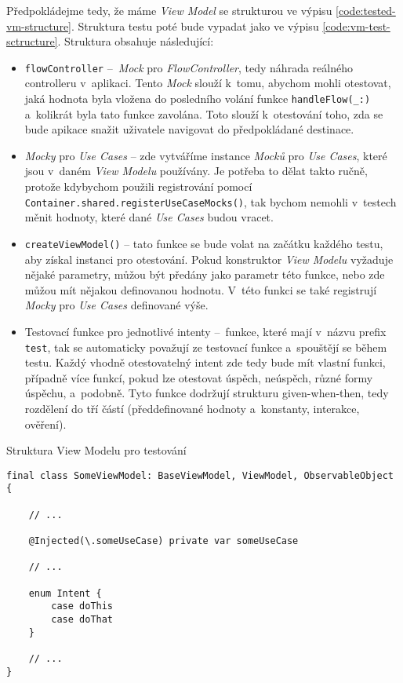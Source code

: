 Předpokládejme tedy, že máme \emph{View Model} se strukturou ve výpisu \ref{code:tested-vm-structure}. Struktura testu poté bude vypadat jako ve výpisu \ref{code:vm-test-sctructure}. Struktura obsahuje následující:
\begin{itemize}
\item\texttt{flowController} – \emph{Mock} pro \emph{FlowController}, tedy náhrada reálného controlleru v~aplikaci. Tento \emph{Mock} slouží k~tomu, abychom mohli otestovat, jaká hodnota byla vložena do posledního volání funkce \texttt{handleFlow(\_:)} a~kolikrát byla tato funkce zavolána. Toto slouží k~otestování toho, zda se bude apikace snažit uživatele navigovat do předpokládané destinace.
\item\emph{Mocky} pro \emph{Use Cases} – zde vytváříme instance \emph{Mocků} pro \emph{Use Cases}, které jsou v~daném \emph{View Modelu} používány. Je potřeba to dělat takto ručně, protože kdybychom použili registrování pomocí \texttt{Container.shared.registerUseCaseMocks()}, tak bychom nemohli v~testech měnit hodnoty, které dané \emph{Use Cases} budou vracet.
\item\texttt{createViewModel()} – tato funkce se bude volat na začátku každého testu, aby získal instanci pro otestování. Pokud konstruktor \emph{View Modelu} vyžaduje nějaké parametry, můžou být předány jako parametr této funkce, nebo zde můžou mít nějakou definovanou hodnotu. V~této funkci se také registrují \emph{Mocky} pro \emph{Use Cases} definované výše.
\item Testovací funkce pro jednotlivé intenty – funkce, které mají v~názvu prefix \texttt{test}, tak se automaticky považují ze testovací funkce a~spouštějí se během testu. Každý vhodně otestovatelný intent zde tedy bude mít vlastní funkci, případně více funkcí, pokud lze otestovat úspěch, neúspěch, různé formy úspěchu, a~podobně. Tyto funkce dodržují strukturu given-when-then, tedy rozdělení do tří částí (předdefinované hodnoty a~konstanty, interakce, ověření).
\end{itemize}

\begin{listing}
\caption{Struktura View Modelu pro testování}\label{code:tested-vm-structure}
\begin{verbatim}
final class SomeViewModel: BaseViewModel, ViewModel, ObservableObject {
	
    // ...
	
    @Injected(\.someUseCase) private var someUseCase
	
    // ...
	
    enum Intent {
        case doThis
        case doThat
    }
	
    // ...
}
\end{verbatim}
\end{listing}


